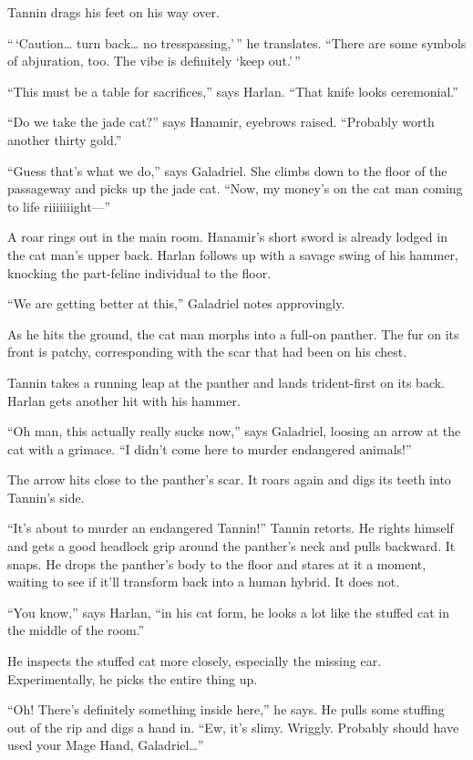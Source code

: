 \documentclass[smalldemyvopaper,11pt,twoside,onecolumn,openright,extrafontsizes]{memoir}
\newlength\drop
\begin{document}
Tannin drags his feet on his way over.

``\,`Caution\ldots{} turn back\ldots{} no tresspassing,'\,'' he
translates. ``There are some symbols of abjuration, too. The vibe is
definitely `keep out.'\,''

``This must be a table for sacrifices,'' says Harlan. ``That knife looks
ceremonial.''

``Do we take the jade cat?'' says Hanamir, eyebrows raised. ``Probably
worth another thirty gold.''

``Guess that's what we do,'' says Galadriel. She climbs down to the
floor of the passageway and picks up the jade cat. ``Now, my money's on
the cat man coming to life riiiiiiight---''

A roar rings out in the main room. Hanamir's short sword is already
lodged in the cat man's upper back. Harlan follows up with a savage
swing of his hammer, knocking the part-feline individual to the floor.

``We are getting better at this,'' Galadriel notes approvingly.

As he hits the ground, the cat man morphs into a full-on panther. The
fur on its front is patchy, corresponding with the scar that had been on
his chest.

Tannin takes a running leap at the panther and lands trident-first on
its back. Harlan gets another hit with his hammer.

``Oh man, this actually really sucks now,'' says Galadriel, loosing an
arrow at the cat with a grimace. ``I didn't come here to murder
endangered animals!''

The arrow hits close to the panther's scar. It roars again and digs its
teeth into Tannin's side.

``It's about to murder an endangered Tannin!'' Tannin retorts. He rights
himself and gets a good headlock grip around the panther's neck and
pulls backward. It snaps. He drops the panther's body to the floor and
stares at it a moment, waiting to see if it'll transform back into a
human hybrid. It does not.

``You know,'' says Harlan, ``in his cat form, he looks a lot like the
stuffed cat in the middle of the room.''

He inspects the stuffed cat more closely, especially the missing ear.
Experimentally, he picks the entire thing up.

``Oh! There's definitely something inside here,'' he says. He pulls some
stuffing out of the rip and digs a hand in. ``Ew, it's slimy. Wriggly.
Probably should have used your Mage Hand, Galadriel\ldots{}''
\end{document}
